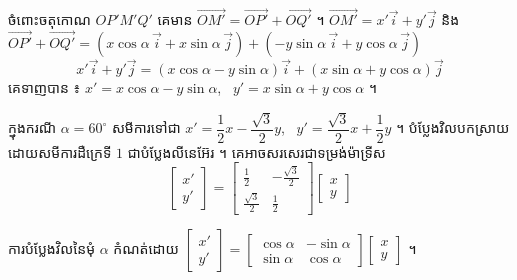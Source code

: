 ចំពោះចតុកោណ $OP'M'Q'$ គេមាន $\overrightarrow{OM'} = \overrightarrow{OP'} + \overrightarrow{OQ'}$ ។ $\overrightarrow{OM'} = x'\overrightarrow{i} + y'\overrightarrow{j}$ និង $\overrightarrow{OP'} + \overrightarrow{OQ'} = (x\cos\alpha\,\overrightarrow{i} + x\sin\alpha\,\overrightarrow{j}) + (-y\sin\alpha\,\overrightarrow{i} + y\cos\alpha\,\overrightarrow{j})$
\[ x'\overrightarrow{i} + y'\overrightarrow{j} = (x\cos\alpha - y\sin\alpha)\overrightarrow{i} + (x\sin\alpha + y\cos\alpha)\overrightarrow{j} \]
គេទាញបាន ៖ $x' = x\cos\alpha - y\sin\alpha$, \ $y' = x\sin\alpha + y\cos\alpha$ ។

ក្នុងករណី $\alpha = 60^\circ$ សមីការទៅជា $x' = \dfrac{1}{2}x - \dfrac{\sqrt{3}}{2}y$, \ $y' = \dfrac{\sqrt{3}}{2}x + \dfrac{1}{2}y$ ។ បំប្លែងវិលបកស្រាយដោយសមីការដឺក្រេទី $1$ ជាបំប្លែងលីនេអ៊ែរ ។ គេអាចសរសេរជាទម្រង់ម៉ាទ្រីស
\[ \begin{bmatrix} x'\\ y' \end{bmatrix} = \begin{bmatrix} \frac{1}{2} & -\frac{\sqrt{3}}{2}\\[3pt] \frac{\sqrt{3}}{2} & \frac{1}{2} \end{bmatrix}\begin{bmatrix} x\\ y \end{bmatrix} \]

\begin{formulaBox}[ជាទូទៅ]
ការបំប្លែងវិលនៃមុំ $\alpha$ កំណត់ដោយ $\begin{bmatrix} x'\\ y' \end{bmatrix} = \begin{bmatrix} \cos\alpha & -\sin\alpha\\ \sin\alpha & \cos\alpha \end{bmatrix}\begin{bmatrix} x\\ y \end{bmatrix}$ ។
\end{formulaBox}

